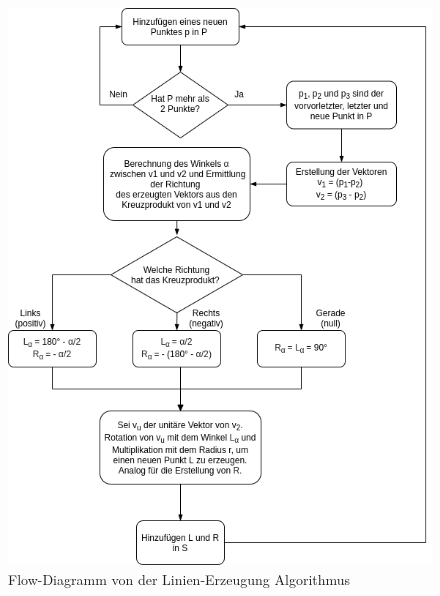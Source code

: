 \documentclass[doktyp=studarbeit]{TUBAFarbeiten}
\begin{document}
\begin{figure}[!htb]
    \centering
    \includegraphics[width=0.8\linewidth]{line.png}
    \caption{Flow-Diagramm von der Linien-Erzeugung Algorithmus}
    \label{fig:line-alg}
\end{figure}
\end{document}
